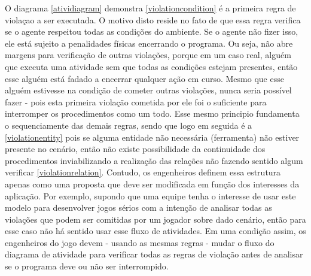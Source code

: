 O diagrama \ref{atividiagram} demonstra \ref{violationcondition} é a primeira regra de violaçao a ser executada. O motivo disto reside no fato de que essa regra verifica se o agente respeitou todas as condições do ambiente. Se o agente não 
fizer isso, ele está sujeito a penalidades físicas encerrando o programa. Ou seja, não abre margens para verificação de outras violações, porque em um caso real, alguém que executa uma atividade sem que todas as condições estejam presentes, 
então esse alguém está fadado a encerrar qualquer ação em curso. Mesmo que esse alguém estivesse na condição de cometer outras violações, nunca seria possível fazer - pois esta primeira violação cometida por ele foi o suficiente para interromper 
os procedimentos como um todo. Esse mesmo principio fundamenta o sequenciamente das demais regras, sendo que logo em seguida é a \ref{violationentity} pois se alguma entidade não necessária (ferramenta) não estiver presente no cenário, 
então não existe possibilidade da continuidade dos procedimentos inviabilizando a realização das relações não fazendo sentido algum verificar \ref{violationrelation}. Contudo, os engenheiros definem essa estrutura apenas como uma proposta que deve 
ser modificada em função dos interesses da aplicação. Por exemplo, supondo que uma equipe tenha o interesse de usar este modelo para desenvolver jogos sérios com a intenção de analisar todas as violações que podem ser comitidas por um jogador 
sobre dado cenário, então para esse caso não há sentido usar esse fluxo de atividades. Em uma condição assim, os engenheiros do jogo devem - usando as mesmas regras - mudar o fluxo do diagrama de atividade 
para verificar todas as regras de violação antes de analisar se o programa deve ou não ser interrompido.